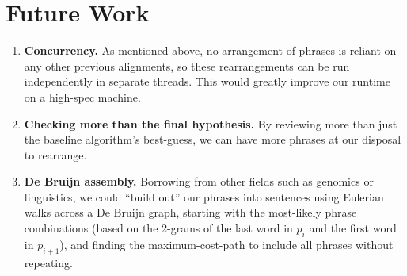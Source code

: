 \documentclass[a4paper]{article}
\begin{document}
\section{Future Work}

\begin{enumerate}
    \item \textbf{Concurrency.} As mentioned above, no arrangement of phrases is reliant on any other previous alignments, so these rearrangements can be run independently in separate threads. This would greatly improve our runtime on a high-spec machine.
    \item \textbf{Checking more than the final hypothesis.} By reviewing more than just the baseline algorithm's best-guess, we can have more phrases at our disposal to rearrange.
    \item \textbf{De Bruijn assembly.} Borrowing from other fields such as genomics or linguistics, we could ``build out'' our phrases into sentences using Eulerian walks across a De Bruijn graph, starting with the most-likely phrase combinations (based on the 2-grams of the last word in $p_i$ and the first word in $p_{i+1}$), and finding the maximum-cost-path to include all phrases without repeating.
\end{enumerate}
\end{document}
